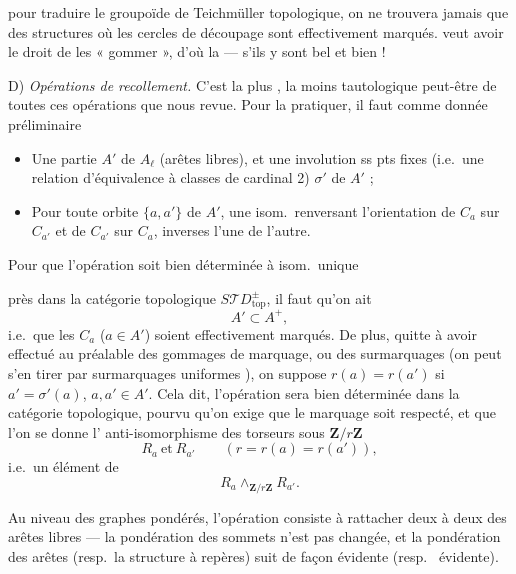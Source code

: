 \documentclass[11pt,a4paper]{article}
\begin{document}
pour \struck{\ill{}} traduire le groupoïde de Teichmüller topologique, on ne
trouvera jamais que des structures où les cercles de découpage sont
effectivement marqués.   veut
avoir le droit de les « gommer », d'où la 
 ---  s'ils y sont bel et bien !

D) \emph{Opérations de recollement.} C'est la plus \struck{\ill{}}
, la moins tautologique peut-être de toutes ces opérations
que nous  revue. Pour la pratiquer, il faut comme donnée
préliminaire
\begin{itemize}
  \item[a)] Une partie \struck{\ill{}} $A'$ de $A_{\ell}$ (arêtes libres),
    et une involution ss pts fixes (i.e.\ une relation d'équivalence à
    classes de cardinal 2) $\sigma'$ de $A'$ \struck{\ill{}} ;
  \item[b)] Pour  toute orbite
    $\lbrace a, a' \rbrace$ de $A'$, une isom.\ renversant l'orientation
    de $C_a$ sur $C_{a'}$ et de $C_{a'}$ sur $C_a$, inverses l'une de
    l'autre.
\end{itemize}
Pour que l'opération soit bien déterminée à isom.\ unique

près dans la catégorie topologique $S\mathcal{T}D^{\pm}_{\mathrm{top}}$, il
faut \struck{\ill{}} qu'on ait
\[
A' \subset A^{+},
\]
i.e.\ que les $C_a$ ($a \in A'$) soient effectivement marqués. De plus,
quitte à avoir effectué au préalable des gommages de marquage, ou des
surmarquages (on peut  s'en tirer par surmarquages
uniformes \ill{} \ill{}), on suppose $r(a) = r(a')$ si $a' = \sigma'(a)$,
$a, a' \in A'$. Cela dit, l'opération sera bien déterminée dans la
catégorie topologique, pourvu qu'on  exige que le marquage soit
respecté, et que l'on se donne l'\struck{\ill{}} anti-isomorphisme des
torseurs sous $\mathbf{Z}/r\mathbf{Z}$
\[
R_a \ \text{et}\ R_{a'} \qquad (r = r(a) = r(a')),
\]
i.e.\ un élément de
\[
R_a \wedge_{\mathbf{Z}/r\mathbf{Z}} R_{a'} .
\]

 Au niveau des graphes pondérés, l'opération
consiste à rattacher deux à deux  des arêtes libres ---
la pondération des sommets n'est pas changée, et la pondération des arêtes
(resp.\ la structure à repères) suit de façon \struck{\ill{}} évidente
(resp.\ \ill{} évidente).
\end{document}
